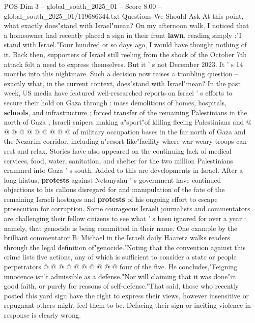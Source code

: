 \begin{textsample}{POS Dim 3 – global\_south\_2025\_01 – Score 8.00 – global\_south\_2025\_01/119686344.txt}  \label{ex:f3_pos_387}
Questions We Should Ask At this point, what exactly does"stand with Israel"mean?
On my afternoon walk, I noticed that a homeowner had recently placed a sign in their front \textbf{lawn}, reading simply :"I stand with Israel."Four hundred or so days ago, I would have thought nothing of it.
Back then, supporters of Israel still reeling from the shock of the October 7th attack felt a need to express themselves.
But it ' s not December 2023.
It ' s 14 months into this nightmare.
Such a decision now raises a troubling question -- exactly what, in the current context, does"stand with Israel"mean?
In the past week, US media have featured well-researched reports on Israel ' s efforts to secure their hold on Gaza through : mass demolitions of homes, hospitals, \textbf{schools}, and infrastructure ; forced transfer of the remaining Palestinians in the north of Gaza ; Israeli snipers making a"sport"of killing fleeing Palestinians and @ @ @ @ @ @ @ @ @ @ of military occupation bases in the far north of Gaza and the Nezarim corridor, including a"resort-like"facility where war-weary troops can rest and relax.
Stories have also appeared on the continuing lack of medical services, food, water, sanitation, and shelter for the two million Palestinians crammed into Gaza ' s south.
Added to this are developments in Israel.
After a long hiatus, \textbf{protests} against Netanyahu ' s government have continued -- objections to his callous disregard for and manipulation of the fate of the remaining Israeli hostages and \textbf{protests} of his ongoing effort to escape prosecution for corruption.
Some courageous Israeli journalists and commentators are challenging their fellow citizens to see what ' s been ignored for over a year : namely, that genocide is being committed in their name.
One example by the brilliant commentator B.
Michael in the Israeli daily Haaretz walks readers through the legal definition of"genocide."Noting that the convention against this crime lists five actions, any of which is sufficient to consider a state or people perpetrators @ @ @ @ @ @ @ @ @ @ four of the five.
He concludes,"Feigning innocence isn't admissible as a defense."Nor will claiming that it was done"in good faith, or purely for reasons of self-defense."That said, those who recently posted this yard sign have the right to express their views, however insensitive or repugnant others might feel them to be.
Defacing their sign or inciting violence in response is clearly wrong.

\end{textsample}
